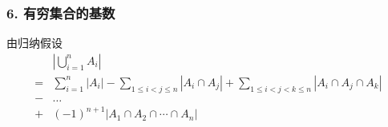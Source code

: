 \documentclass{beamer}
\begin{document}
\begin{CJK*}{UTF8}{gbsn}
\begin{frame}
\end{frame}

\begin{frame}
  \frametitle{6. 有穷集合的基数}
  由归纳假设
  \begin{equation}\label{eq2}
\begin{split}
    &|\bigcup_{i=1}^nA_i|\\
=&\sum_{i=1}^n|A_i| - \sum_{1\leq i < j \leq n}|A_i \cap A_j| + \sum_{1 \leq  i < j < k \leq n}|A_i \cap A_j \cap A_k|\\
-&\ldots\\
+&(-1)^{n+1}|A_1 \cap A_2 \cap \cdots \cap A_n| 
  \end{split}
\end{equation}
  
\end{frame}


\end{CJK*}
\end{document}
